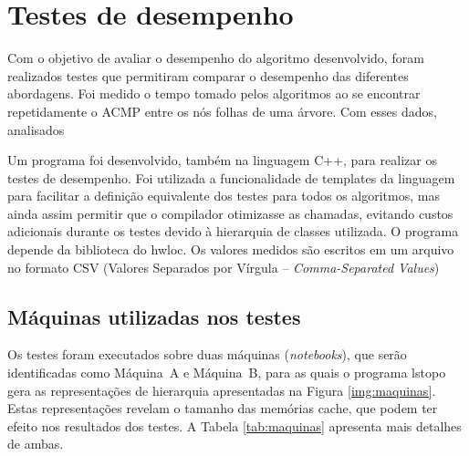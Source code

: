 
\chapter{Testes de desempenho}

Com o objetivo de avaliar o desempenho do algoritmo desenvolvido, foram realizados testes
que permitiram comparar o desempenho das diferentes abordagens.
Foi medido o tempo tomado pelos algoritmos
ao se encontrar repetidamente o ACMP entre os nós folhas de uma árvore.
Com esses dados, analisados

Um programa foi desenvolvido, também na linguagem C++, para realizar os testes de desempenho.
Foi utilizada a funcionalidade de templates da linguagem para facilitar a definição equivalente dos testes para todos os algoritmos, mas ainda assim permitir que o compilador otimizasse as chamadas, evitando custos adicionais durante os testes devido à hierarquia de classes utilizada.
O programa depende da biblioteca do hwloc.
Os valores medidos são escritos em um arquivo no formato CSV (Valores Separados por Vírgula -- \textit{Comma-Separated Values})


\section{Máquinas utilizadas nos testes}

Os testes foram executados sobre duas máquinas (\textit{notebooks}), que serão identificadas como Máquina~A e Máquina~B, para as quais o programa lstopo gera as representações de hierarquia apresentadas na Figura \ref{img:maquinas}.
Estas representações revelam o tamanho das memórias cache, que podem ter efeito nos resultados dos testes.
A Tabela \ref{tab:maquinas} apresenta mais detalhes de ambas.



